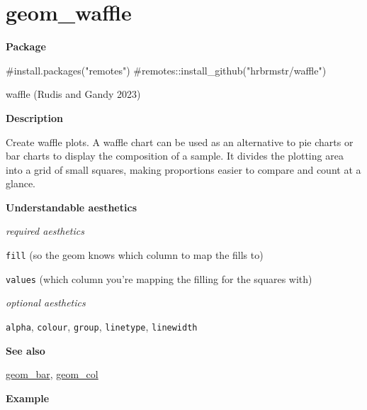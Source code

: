 \documentclass[
  letterpaper,
  DIV=11,
  numbers=noendperiod]{scrreprt}
\newenvironment{Shaded}{\begin{snugshade}}{\end{snugshade}}
\newcommand{\CommentTok}[1]{\textcolor[rgb]{0.37,0.37,0.37}{#1}}
\begin{document}
\section{geom\_waffle}\label{waffle}

\textbf{Package}

\begin{Shaded}
\begin{Highlighting}[]
\CommentTok{\#install.packages("remotes")}
\CommentTok{\#remotes::install\_github("hrbrmstr/waffle")}
\end{Highlighting}
\end{Shaded}

waffle (Rudis and Gandy 2023)

\textbf{Description}

Create waffle plots. A waffle chart can be used as an alternative to pie
charts or bar charts to display the composition of a sample. It divides
the plotting area into a grid of small squares, making proportions
easier to compare and count at a glance.

\textbf{Understandable aesthetics}

\emph{required aesthetics}

\texttt{fill} (so the geom knows which column to map the fills to)

\texttt{values} (which column you're mapping the filling for the squares
with)

\emph{optional aesthetics}

\texttt{alpha}, \texttt{colour}, \texttt{group}, \texttt{linetype},
\texttt{linewidth}

\textbf{See also}

\hyperref[bar]{geom\_bar}, \hyperref[col]{geom\_col}

\textbf{Example}
\end{document}
